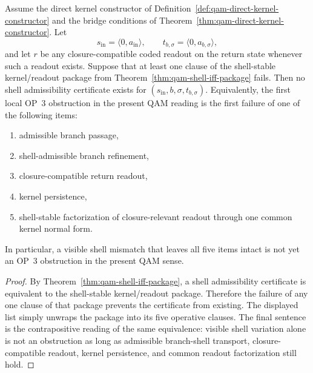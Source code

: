 \begin{lemma}\label{lem:qam-shell-obstruction}
Assume the direct kernel constructor of Definition~\ref{def:qam-direct-kernel-constructor} and the bridge conditions of Theorem~\ref{thm:qam-direct-kernel-constructor}. Let
\[
s_{\mathrm{in}}=\langle 0,a_{\mathrm{in}}\rangle,
\qquad
 t_{b,\sigma}=\langle 0,a_{b,\sigma}\rangle,
\]
and let $r$ be any closure-compatible coded readout on the return state whenever such a readout exists. Suppose that at least one clause of the shell-stable kernel/readout package from Theorem~\ref{thm:qam-shell-iff-package} fails. Then no shell admissibility certificate exists for $(s_{\mathrm{in}},b,\sigma,t_{b,\sigma})$. Equivalently, the first local OP~3 obstruction in the present QAM reading is the first failure of one of the following items:
\begin{enumerate}[leftmargin=2em,label=(\roman*)]
 \item admissible branch passage,
 \item shell-admissible branch refinement,
 \item closure-compatible return readout,
 \item kernel persistence,
 \item shell-stable factorization of closure-relevant readout through one common kernel normal form.
\end{enumerate}
In particular, a visible shell mismatch that leaves all five items intact is not yet an OP~3 obstruction in the present QAM sense.
\end{lemma}

\begin{proof}
By Theorem~\ref{thm:qam-shell-iff-package}, a shell admissibility certificate is equivalent to the shell-stable kernel/readout package. Therefore the failure of any one clause of that package prevents the certificate from existing. The displayed list simply unwraps the package into its five operative clauses. The final sentence is the contrapositive reading of the same equivalence: visible shell variation alone is not an obstruction as long as admissible branch-shell transport, closure-compatible readout, kernel persistence, and common readout factorization still hold.
\end{proof}

